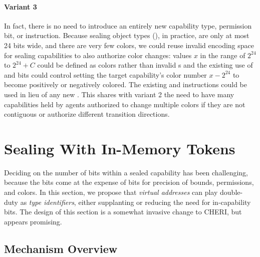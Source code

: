 \paragraph{Variant 3}
%
In fact, there is no need to introduce an entirely new capability type,
permission bit, or instruction.  Because sealing object types
(\cotype{}), in practice, are only at most 24
bits wide, and there are very few colors, we could reuse invalid encoding space
for sealing capabilities to also authorize color changes: values $x$ in the
range of $2^{24}$ to $2^{24}+C$ could be defined as colors rather than invalid
\cotype{}s and the existing use of \cappermSeal and \cappermUnseal bits could
control setting the target capability's color number $x - 2^{24}$ to become
positively or negatively colored.  The existing  and
instructions could be used in lieu of any new
.  This shares with variant 2 the need to have many capabilities
held by agents authorized to change multiple colors if they are not contiguous
or authorize different transition directions.


\section{Sealing With In-Memory Tokens} %
\label{app:exp:typetoken}

Deciding on the number of \cotype{} bits within a sealed capability has
been challenging, because the bits come at the expense of bits for precision
of bounds, permissions, and colors.  In this section, we propose that
\emph{virtual addresses} can play double-duty as \emph{type identifiers},
either supplanting or reducing the need for in-capability \cotype{}
bits.  The design of this section is a somewhat invasive change to CHERI,
but appears promising.

\subsection{Mechanism Overview} %

